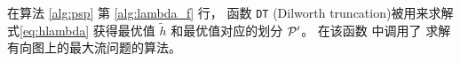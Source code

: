 在算法 \ref{alg:psp} 第 \ref{alg:lambda_f} 行，
函数 \texttt{DT} (Dilworth truncation)被用来求解式\eqref{eq:hlambda} 获得最优值
$\tilde{h}$ 和最优值对应的划分 $\P'$。
%
在该函数
中调用了
求解有向图上的最大流问题的算法。
%
